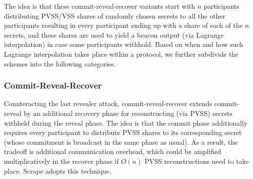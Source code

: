 \documentclass[letterpaper,twocolumn,10pt]{article}
\theoremstyle{definition}
\theoremstyle{remark}
\begin{document}
The idea is that these commit-reveal-recover variants start with $n$ participants distributing PVSS/VSS shares of randomly chosen secrets to all the other participants resulting in every participant ending up with a share of each of the $n$ secrets, and these shares are used to yield a beacon output (via Lagrange interpolation) in case some participants withhold. Based on when and how such Lagrange interpolation takes place within a protocol, we further subdivide the schemes into the following categories.

\subsubsection{Commit-Reveal-Recover}
Counteracting the last revealer attack, commit-reveal-recover extends commit-reveal by an additional recovery phase for reconstructing (via PVSS) secrets withheld during the reveal phase. The idea is that the commit phase additionally requires every participant to distribute PVSS shares to its corresponding secret (whose commitment is broadcast in the same phase as usual). As a result, the tradeoff is additional communication overhead, which could be amplified multiplicatively in the recover phase if $O(n)$ PVSS reconstructions need to take place. Scrape \cite{cascudo2017scrape} adopts this technique.\\
\end{document}
